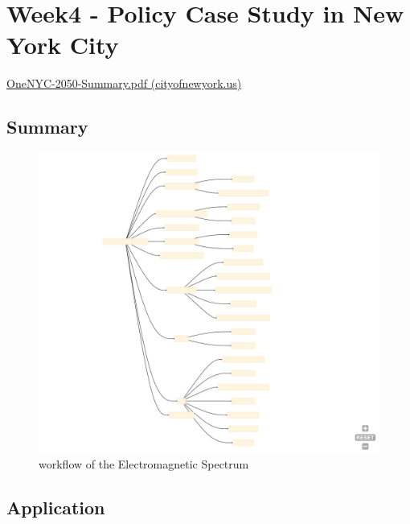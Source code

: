 \documentclass[
  letterpaper,
  DIV=11,
  numbers=noendperiod]{scrreprt}
\begin{document}

\hypertarget{week4---policy-case-study-in-new-york-city}{%
\chapter{Week4 - Policy Case Study in New York
City}\label{week4---policy-case-study-in-new-york-city}}

\href{https://onenyc.cityofnewyork.us/wp-content/uploads/2019/05/OneNYC-2050-Summary.pdf}{OneNYC-2050-Summary.pdf
(cityofnewyork.us)}

\hypertarget{summary-2}{%
\section{Summary}\label{summary-2}}

\begin{figure}

{\centering \includegraphics{./images/Wk4_NYC plan.svg}

}

\caption{\label{fig-wk4NYC}workflow of the Electromagnetic Spectrum}

\end{figure}

\hypertarget{application-1}{%
\section{Application}\label{application-1}}
\end{document}
